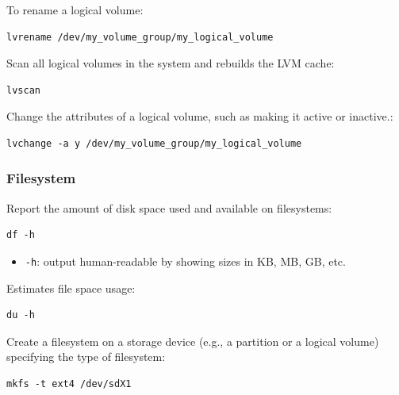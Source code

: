 \documentclass{article}
\newenvironment{codetemplate}[1][]{%
  \mybasecolorbox[#1]
  \itshape
}{%
  \endmybasecolorbox
}
\begin{document}
To rename a logical volume:
\begin{codetemplate}
\begin{verbatim}
lvrename /dev/my_volume_group/my_logical_volume
\end{verbatim}
\end{codetemplate}

Scan all logical volumes in the system and rebuilds the LVM cache:
\begin{codetemplate}
\begin{verbatim}
lvscan
\end{verbatim}
\end{codetemplate}

Change the attributes of a logical volume, such as making it active or inactive.:
\begin{codetemplate}
\begin{verbatim}
lvchange -a y /dev/my_volume_group/my_logical_volume
\end{verbatim}
\end{codetemplate}

\subsubsection{Filesystem}
Report the amount of disk space used and available on filesystems:
\begin{codetemplate}
\begin{verbatim}
df -h
\end{verbatim}
\end{codetemplate}

\begin{itemize}
    \item \verb|-h|: output human-readable by showing sizes in KB, MB, GB, etc.
\end{itemize}

Estimates file space usage:
\begin{codetemplate}
\begin{verbatim}
du -h
\end{verbatim}
\end{codetemplate}

Create a filesystem on a storage device (e.g., a partition or a logical volume) specifying the type of filesystem:
\begin{codetemplate}
\begin{verbatim}
mkfs -t ext4 /dev/sdX1
\end{verbatim}
\end{codetemplate}
\end{document}
